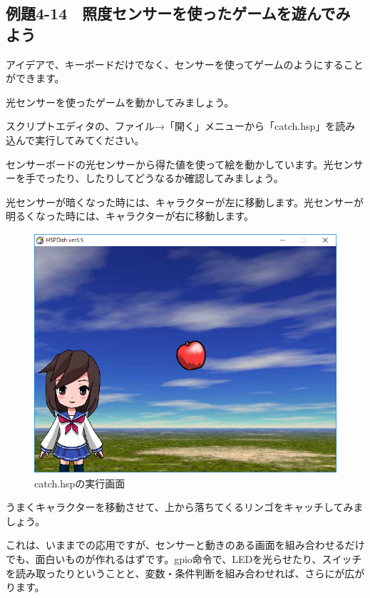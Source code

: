 \newpage
\subsection{例題4-14　照度センサーを使ったゲームを遊んでみよう}

\begin{description}
    \item {}
\end{description}


アイデアで、キーボードだけでなく、センサーを使ってゲームのようにすることができます。

光センサーを使ったゲームを動かしてみましょう。


スクリプトエディタの、ファイル→「開く」メニューから「catch.hsp」を読み込んで実行してみてください。


\begin{description}
    \item {}
\end{description}

センサーボードの光センサーから得た値を使って絵を動かしています。光センサーを手でったり、したりしてどうなるか確認してみましょう。

光センサーが暗くなった時には、キャラクターが左に移動します。光センサーが明るくなった時には、キャラクターが右に移動します。


\begin{figure}[H]
    \begin{center}
      \includegraphics[keepaspectratio,width=11.269cm,height=8.89cm]{text04-img/s_catch.png}
      \caption{catch.hspの実行画面}
    \end{center}
    \label{fig:prog_menu}
\end{figure}

うまくキャラクターを移動させて、上から落ちてくるリンゴをキャッチしてみましょう。

これは、いままでの応用ですが、センサーと動きのある画面を組み合わせるだけでも、面白いものが作れるはずです。gpio命令で、LEDを光らせたり、スイッチを読み取ったりということと、変数・条件判断を組み合わせれば、さらにが広がります。













